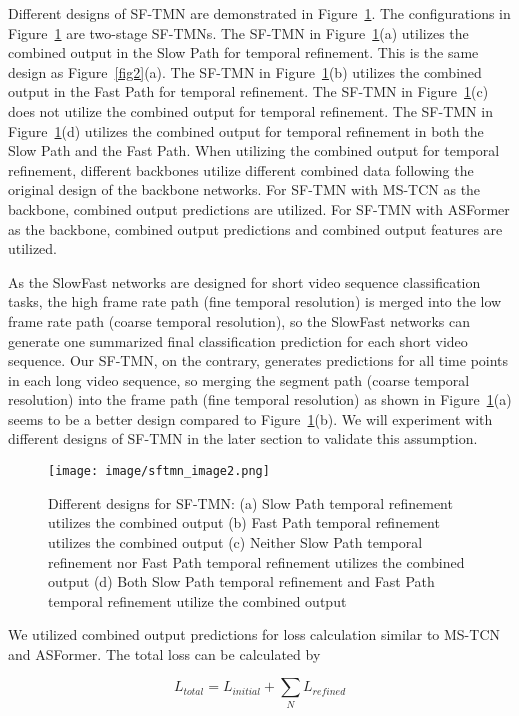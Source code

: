 \documentclass[sn-mathphys,Numbered]{sn-jnl}
\theoremstyle{thmstyleone}\newtheorem{theorem}{Theorem}\newtheorem{proposition}[theorem]{Proposition}
\theoremstyle{thmstyletwo}\newtheorem{example}{Example}\newtheorem{remark}{Remark}
\theoremstyle{thmstylethree}\newtheorem{definition}{Definition}
\begin{document}
Different designs of SF-TMN are demonstrated in Figure~\ref{fig3}. The configurations in Figure~\ref{fig3} are two-stage SF-TMNs. The SF-TMN in Figure~\ref{fig3}(a) utilizes the combined output in the Slow Path for temporal refinement. This is the same design as Figure~\ref{fig2}(a). The SF-TMN in Figure~\ref{fig3}(b) utilizes the combined output in the Fast Path for temporal refinement. The SF-TMN in Figure~\ref{fig3}(c) does not utilize the combined output for temporal refinement. The SF-TMN in Figure~\ref{fig3}(d) utilizes the combined output for temporal refinement in both the Slow Path and the Fast Path. When utilizing the combined output for temporal refinement, different backbones utilize different combined data following the original design of the backbone networks. For SF-TMN with MS-TCN as the backbone, combined output predictions are utilized. For SF-TMN with ASFormer as the backbone, combined output predictions and combined output features are utilized. 

As the SlowFast networks are designed for short video sequence classification tasks, the high frame rate path (fine temporal resolution) is merged into the low frame rate path (coarse temporal resolution), so the SlowFast networks can generate one summarized final classification prediction for each short video sequence. Our SF-TMN, on the contrary, generates predictions for all time points in each long video sequence, so merging the segment path (coarse temporal resolution) into the frame path (fine temporal resolution) as shown in Figure~\ref{fig3}(a) seems to be a better design compared to Figure~\ref{fig3}(b). We will experiment with different designs of SF-TMN in the later section to validate this assumption. 

\begin{figure}[h]\centering
\texttt{[image: image/sftmn\_image2.png]}
\caption{Different designs for SF-TMN: (a) Slow Path temporal refinement utilizes the combined output (b) Fast Path temporal refinement utilizes the combined output (c) Neither Slow Path temporal refinement nor Fast Path temporal refinement utilizes the combined output (d) Both Slow Path temporal refinement and Fast Path temporal refinement utilize the combined output}\label{fig3}
\end{figure}

We utilized combined output predictions for loss calculation similar to MS-TCN and ASFormer. The total loss can be calculated by

\begin{equation}
L_{total} = L_{initial} + \sum_{N} L_{refined}
\end{equation}
\end{document}

